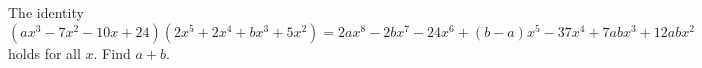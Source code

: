 The identity
\[\left(ax^3-7x^2-10x+24\right)\left(2x^5+2x^4+bx^3+5x^2\right)=2ax^8-2bx^7-24x^6+(b-a)x^5-37x^4+7abx^3+12abx^2\]
holds for all $x$. Find $a+b$.
